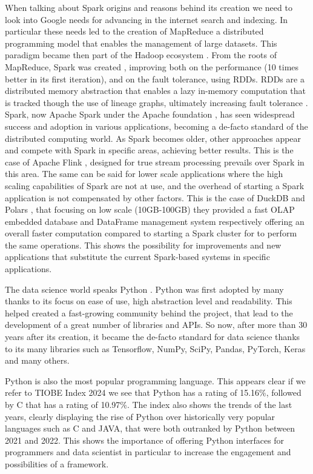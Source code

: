 When talking about Spark origins and reasons behind its creation we need to look into Google needs for advancing in the internet search and indexing. In particular these needs led to the creation of MapReduce \cite{deanMapReduceSimplifiedData2008} a distributed programming model that enables the management of large datasets. This paradigm became then part of the Hadoop ecosystem \cite{ApacheHadoop}. 
From the roots of MapReduce, Spark was created \cite{zahariaApacheSparkUnified2016}, improving both on the performance (10 times better in its first iteration), and on the fault tolerance, using \glspl{RDD}. \glspl{RDD} are a distributed memory abstraction that enables a lazy in-memory computation that is tracked though the use of lineage graphs, ultimately increasing fault tolerance \cite{Zaharia:EECS-2011-82}. 
Spark, now Apache Spark under the Apache foundation \cite{ApacheSparkUnified}, has seen widespread success and adoption in various applications, becoming a de-facto standard of the distributed computing world. As Spark becomes older, other approaches appear and compete with Spark in specific areas, achieving better results. This is the case of Apache Flink \cite{carboneApacheFlinkStream}, designed for true stream processing prevails over Spark in this area. The same can be said for lower scale applications where the high scaling capabilities of Spark are not at use, and the overhead of starting a Spark application is not compensated by other factors. This is the case of DuckDB \cite{raasveldtDuckDBEmbeddableAnalytical2019} and Polars \cite{vinkWroteOneFastest2021}, that focusing on low scale (10GB-100GB) they provided a fast \gls{OLAP} embedded database and DataFrame management system respectively offering an overall faster computation compared to starting a Spark cluster for to perform the same operations. This shows the possibility for improvements and new applications that substitute the current Spark-based systems in specific applications.

The data science world speaks Python \cite{Python_CS-R9526}. Python was first adopted by many thanks to its focus on ease of use, high abstraction level and readability. This helped created a fast-growing community behind the project, that lead to the development of a great number of libraries and APIs. So now, after more than 30 years after its creation, it became the de-facto standard for data science thanks to its many libraries such as Tensorflow, NumPy, SciPy, Pandas, PyTorch, Keras and many others.

Python is also the most popular programming language. This appears clear if we refer to TIOBE Index 2024 \cite{TIOBEIndex} we see that Python has a rating of 15.16\%, followed by C that has a rating of 10.97\%. The index also shows the trends of the last years, clearly displaying the rise of Python over historically very popular languages such as C and JAVA, that were both outranked by Python between 2021 and 2022. This shows the importance of offering Python interfaces for programmers and data scientist in particular to increase the engagement and possibilities of a framework.